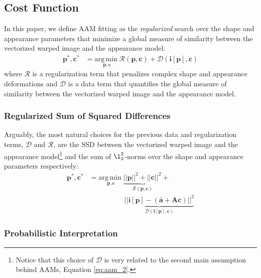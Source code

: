 \subsection{Cost Function}
\label{sec:cost_function}

In this paper, we define AAM fitting as the \emph{regularized} search over the shape and appearance parameters that minimize a global measure of similarity between the vectorized warped image and the appearance model:
\begin{equation}
    \begin{aligned}
        \mathbf{p}^*, \mathbf{c}^* & = \underset{\mathbf{p}, \mathbf{c}} {\mathrm{arg\, min\;}} \mathcal{R} (\mathbf{p}, \mathbf{c}) + \mathcal{D} (\mathbf{i}[\mathbf{p}], \mathbf{c}) 
        \end{aligned}
    \label{eq:aam_fitting}
\end{equation}
where $\mathcal{R}$ is a regularization term that penalizes complex shape and appearance deformations and $\mathcal{D}$ is a data term that
quantifies the global measure of similarity between the vectorized warped image and the appearance model.

\subsubsection{Regularized Sum of Squared Differences}
\label{sec:rssd}

Arguably, the most natural choices for the previous data and regularization terms, $\mathcal{D}$ and $\mathcal{R}$, are the SSD between the vectorized warped image and the appearance model\footnote{Notice that this choice of $\mathcal{D}$ is very related to the second main assumption behind AAMs, Equation \ref{eq:aam_2}.} and the sum of $\l_2^2$-norms over the shape and appearance parameters respectively:
\begin{equation}
    \begin{aligned}
        \mathbf{p}^*, \mathbf{c}^* & = \underset{\mathbf{p}, \mathbf{c}} {\mathrm{arg\, min\;}} \underbrace{||\mathbf{p}||^2 + ||\mathbf{c}||^2}_{\mathcal{R} (\mathbf{p}, \mathbf{c})} +
        \\
        & \qquad \qquad \quad \underbrace{|| \mathbf{i}[\mathbf{p}] - (\mathbf{\bar{a}} + \mathbf{A} \mathbf{c}) ||^2}_{\mathcal{D} (\mathbf{i}[\mathbf{p}], \mathbf{c})}
    \end{aligned}
    \label{eq:rssd}
\end{equation}
\subsubsection*{Probabilistic Interpretation}
\label{sec:rssd_pi}

